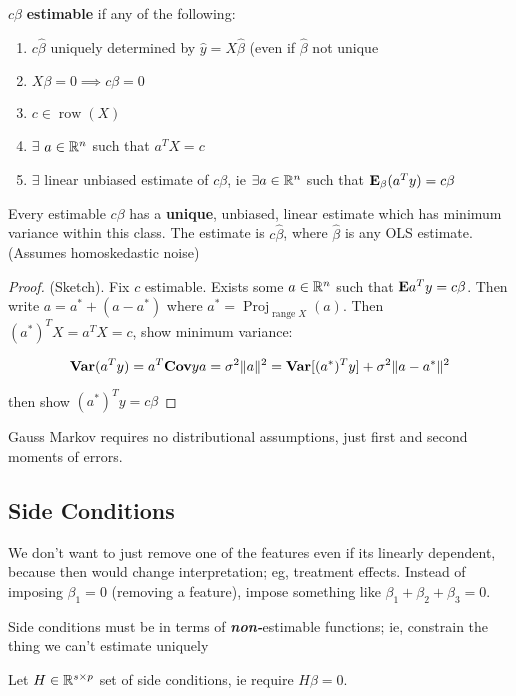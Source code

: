 \documentclass{article}
\newcommand{\range}{\operatorname{range}}
\begin{document}
\begin{definition}[Estimability]
    $c\beta$ \textbf{estimable} if any of the following:
    \begin{enumerate}
        \item $c\hat \beta $ uniquely determined by $\hat y = X\hat \beta $ (even if $\hat \beta$ not unique 
        \item $X\beta = 0 \implies c\beta = 0$
        \item $c \in \operatorname{row}(X)$
        \item $\exists$ $a\in \mathbb R^n$ such that $a^T X = c$
        \item $\exists$ linear unbiased estimate of $c\beta $, ie $\exists a\in \mathbb R^n$ such that $\mathbf{E}_\beta (a^T y) = c\beta $
    \end{enumerate}
\end{definition}
\begin{theorem}
    Every estimable $c\beta$ has a \textbf{unique}, unbiased, linear estimate which has minimum variance within this class. The estimate is $c\hat \beta$, where $\hat \beta$ is any OLS estimate. \\
    (Assumes homoskedastic noise) 
    \begin{proof}
        (Sketch). Fix $c$ estimable. Exists some $a \in \mathbb R^n$ such that $\mathbf{E} a^T y  = c\beta$. Then write $a = a^* + (a- a^*)$ where $a^* = \operatorname{Proj}_{\range X}(a)$. Then $(a^*)^T X = a^TX = c$, show minimum variance:
        
        $$\mathbf{Var} (a^T y) = a^T \mathbf{Cov} y a = \sigma^2 \| a\|^2 = \mathbf{Var} [(a^*)^T y]  + \sigma^2 \|a- a^*\|^2 $$
        
        then show $(a^*)^T y = c\beta $ 
    \end{proof}
    \end{theorem}

    \begin{fact}
        Gauss Markov requires no distributional assumptions, just first and second moments of errors.
    \end{fact}
    \subsection{Side Conditions}
    We don't want to just remove one of the features even if its linearly dependent, because then would change interpretation; eg, treatment effects. Instead of imposing $\beta_1=0$ (removing a feature), impose something like $\beta_1 + \beta_2 + \beta_3 = 0$. 
    \begin{fact}
        Side conditions must be in terms of \textbf{\textit{non-}}estimable functions; ie, constrain the thing we can't estimate uniquely
    \end{fact}
    Let $H\in \mathbb R^{s\times p}$ set of side conditions, ie require $H\beta = 0$. 
\end{document}
